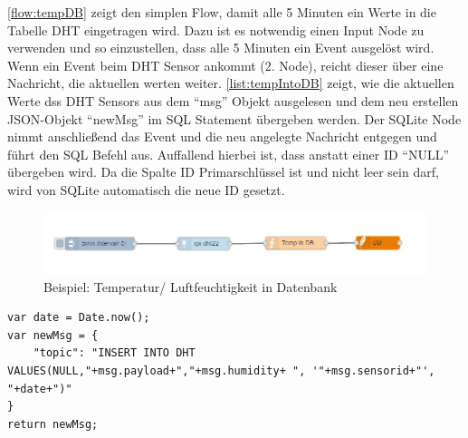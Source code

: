 \autoref{flow:tempDB} zeigt den simplen Flow, damit alle 5 Minuten ein Werte in die Tabelle DHT eingetragen wird. Dazu ist es notwendig einen Input Node zu verwenden und so einzustellen, dass alle 5 Minuten ein Event ausgelöst wird. Wenn ein Event beim DHT Sensor ankommt (2. Node), reicht dieser über eine Nachricht, die aktuellen werten weiter. \autoref{list:tempIntoDB} zeigt, wie die aktuellen Werte dss DHT Sensors aus dem \enquote{msg} Objekt ausgelesen und dem neu erstellen \ac{JSON}-Objekt \enquote{newMsg} im \ac{SQL} Statement übergeben werden. Der SQLite Node nimmt anschließend das Event und die neu angelegte Nachricht entgegen und führt den \ac{SQL} Befehl  aus. Auffallend hierbei ist, dass anstatt einer ID \enquote{NULL} übergeben wird. Da die Spalte ID Primarschlüssel ist und nicht leer sein darf, wird von SQLite automatisch die neue ID gesetzt.
\begin{figure}[h]
	\centering
	\includegraphics[scale=0.7]{images/tempIntoDB}
	\caption{Beispiel: Temperatur/ Luftfeuchtigkeit in Datenbank}
	\label{flow:tempDB}
\end{figure}
\begin{lstlisting}[label=list:tempIntoDB, caption={Neuer Eintrag in Tabelle DHT}]
var date = Date.now();
var newMsg = {
	"topic": "INSERT INTO DHT VALUES(NULL,"+msg.payload+","+msg.humidity+ ", '"+msg.sensorid+"', "+date+")"
}
return newMsg;
\end{lstlisting}


